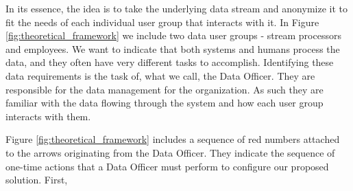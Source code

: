 In its essence, the idea is to take the underlying data stream and anonymize it to fit the needs of each individual user group that interacts with it. In Figure \ref{fig:theoretical_framework} we include two data user groups - stream processors and employees. We want to indicate that both systems and humans process the data, and they often have very different tasks to accomplish. Identifying these data requirements is the task of, what we call, the Data Officer. They are responsible for the data management for the organization. As such they are familiar with the data flowing through the system and how each user group interacts with them. \par
Figure \ref{fig:theoretical_framework} includes a sequence of red numbers attached to the arrows originating from the Data Officer. They indicate the sequence of one-time actions that a Data Officer must perform to configure our proposed solution. First, 

